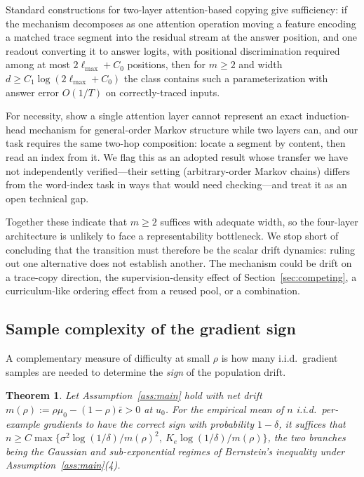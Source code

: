 \documentclass{article}
\theoremstyle{plain}
\newtheorem{theorem}{Theorem}
\theoremstyle{definition}
\theoremstyle{remark}
\newcommand{\1}{\mathbf{1}}
\begin{document}
Standard constructions for two-layer attention-based copying
\citep{olsson2022incontext,ekbote2025what} give sufficiency: if the mechanism
decomposes as one attention operation moving a feature encoding a matched trace
segment into the residual stream at the answer position, and one readout
converting it to answer logits, with positional discrimination required among at
most $2\ell_{\max}+C_0$ positions, then for $m\ge2$ and width
$d\ge C_1\log(2\ell_{\max}+C_0)$ the class contains such a parameterization with
answer error $O(1/T)$ on correctly-traced inputs.

For necessity, \citet{ekbote2025what} show a single attention layer cannot
represent an exact induction-head mechanism for general-order Markov structure
while two layers can, and our task requires the same two-hop composition: locate
a segment by content, then read an index from it. We flag this as an adopted
result whose transfer we have not independently verified---their setting
(arbitrary-order Markov chains) differs from the word-index task in ways that
would need checking---and treat it as an open technical gap.

Together these indicate that $m\ge2$ suffices with adequate width, so the
four-layer architecture is unlikely to face a representability bottleneck. We
stop short of concluding that the transition must therefore be the scalar drift
dynamics: ruling out one alternative does not establish another. The mechanism
could be drift on a trace-copy direction, the supervision-density effect of
Section~\ref{sec:competing}, a curriculum-like ordering effect from a reused
pool, or a combination.

\subsection{Sample complexity of the gradient sign}
\label{app:samplecomplexity}

A complementary measure of difficulty at small $\rho$ is how many i.i.d.\
gradient samples are needed to determine the \emph{sign} of the population drift.

\begin{theorem}
\label{thm:samplecomplexity}
Let Assumption~\ref{ass:main} hold with net drift
$m(\rho) := \rho\mu_0-(1-\rho)\bar\epsilon>0$ at $u_0$. For the empirical mean of
$n$ i.i.d.\ per-example gradients to have the correct sign with probability
$1-\delta$, it suffices that
$n\ge C\max\{\sigma^2\log(1/\delta)/m(\rho)^2,\ K_e\log(1/\delta)/m(\rho)\}$, the
two branches being the Gaussian and sub-exponential regimes of Bernstein's
inequality under Assumption~\ref{ass:main}(4).
\end{theorem}
\end{document}
